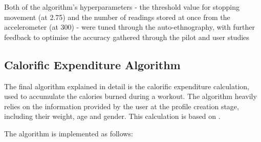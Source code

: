 \documentclass{l4proj}
\begin{document}
Both of the algorithm’s hyperparameters - the threshold value for stopping movement (at 2.75) and the number of readings stored at once from the accelerometer (at 300) - were tuned through the auto-ethnography, with further feedback to optimise the accuracy gathered through the pilot and user studies

\subsection{Calorific Expenditure Algorithm}
\label{sec:calories}

The final algorithm explained in detail is the calorific expenditure calculation, used to accumulate the calories burned during a workout. The algorithm heavily relies on the information provided by the user at the profile creation stage, including their weight, age and gender. This calculation is based on \cite{Dale_Griffin_2023}.

The algorithm is implemented as follows:
\end{document}

